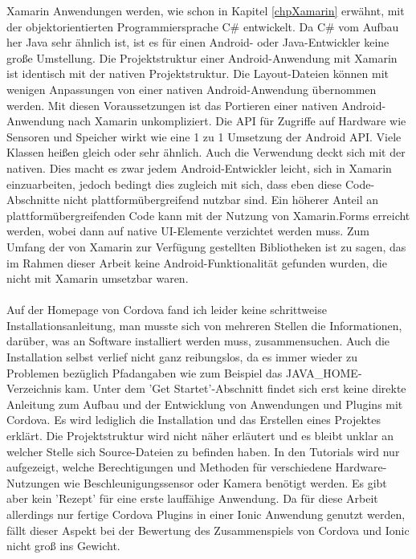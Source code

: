 Xamarin Anwendungen werden, wie schon in Kapitel \ref{chpXamarin} erwähnt, mit der objektorientierten Programmiersprache C\# entwickelt. Da C\# vom Aufbau her Java sehr ähnlich ist, ist es für einen Android- oder Java-Entwickler keine große Umstellung. Die Projektstruktur einer Android-Anwendung mit Xamarin ist identisch mit der nativen Projektstruktur. Die Layout-Dateien können mit wenigen Anpassungen von einer nativen Android-Anwendung übernommen werden. Mit diesen Voraussetzungen ist das Portieren einer nativen Android-Anwendung nach Xamarin unkompliziert. Die API für Zugriffe auf Hardware wie Sensoren und Speicher wirkt wie eine 1 zu 1 Umsetzung der Android API. Viele Klassen heißen gleich oder sehr ähnlich. Auch die Verwendung deckt sich mit der nativen. Dies macht es zwar jedem Android-Entwickler leicht, sich in Xamarin einzuarbeiten, jedoch bedingt dies zugleich mit sich, dass eben diese Code-Abschnitte nicht plattformübergreifend nutzbar sind. Ein höherer Anteil an plattformübergreifenden Code kann mit der Nutzung von Xamarin.Forms erreicht werden, wobei dann auf native UI-Elemente verzichtet werden muss. Zum Umfang der von Xamarin zur Verfügung gestellten Bibliotheken ist zu sagen, das im Rahmen dieser Arbeit keine Android-Funktionalität gefunden wurden, die nicht mit Xamarin umsetzbar waren. 
\\
\\
Auf der Homepage von Cordova fand ich leider keine schrittweise Installationsanleitung, man musste sich von mehreren Stellen die Informationen, darüber, was an Software installiert werden muss, zusammensuchen. Auch die Installation selbst verlief nicht ganz reibungslos, da es immer wieder zu Problemen bezüglich Pfadangaben wie zum Beispiel das JAVA\_HOME-Verzeichnis kam. Unter dem 'Get Startet'-Abschnitt findet sich erst keine direkte Anleitung zum Aufbau und der Entwicklung von Anwendungen und Plugins mit Cordova. Es wird lediglich die Installation und das Erstellen eines Projektes erklärt. Die Projektstruktur wird nicht näher erläutert und es bleibt unklar an welcher Stelle sich Source-Dateien zu befinden haben. In den Tutorials wird nur aufgezeigt, welche Berechtigungen und Methoden für verschiedene Hardware-Nutzungen wie Beschleunigungssensor oder Kamera benötigt werden. Es gibt aber kein 'Rezept' für eine erste lauffähige Anwendung. Da für diese Arbeit allerdings nur fertige Cordova Plugins in einer Ionic Anwendung genutzt werden, fällt dieser Aspekt bei der Bewertung des Zusammenspiels von Cordova und Ionic nicht groß ins Gewicht. 
\\
